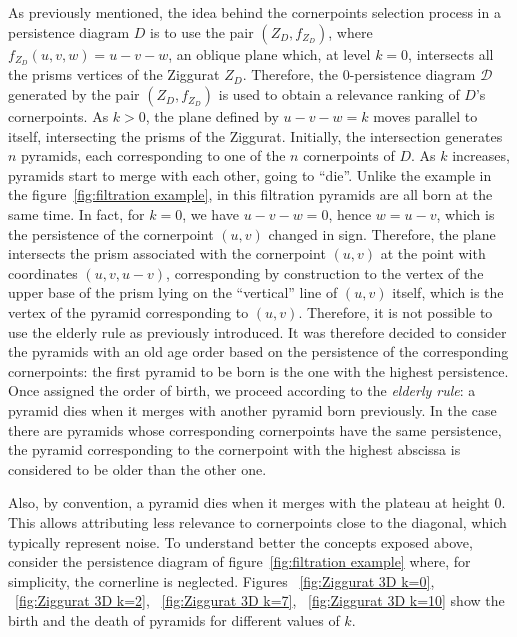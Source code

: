 \documentclass[english, LaM, oneside, noexaminfo]{sapthesis}
\begin{document}
As previously mentioned, the idea behind the cornerpoints selection process in a persistence diagram $D$ is to use the pair $(Z_ {D}, f_ {Z_D})$, where $f_{Z_D}(u, v, w) = u - v - w$, an oblique plane which, at level $k = 0$, intersects all the prisms vertices of the Ziggurat $Z_D$. Therefore, the $0$-persistence diagram $\mathcal{D}$ generated by the pair $(Z_D, f_{Z_D})$ is used to obtain a relevance ranking of $D$'s cornerpoints. As $k>0$, the plane defined by $u-v-w = k$ moves parallel to itself, intersecting the prisms of the Ziggurat. Initially, the intersection generates $n$ pyramids, each corresponding to one of the $n$ cornerpoints of $D$. As $k$ increases, pyramids start to merge with each other, going to ``die''. Unlike the example in the figure~\ref{fig:filtration example}, in this filtration pyramids are all born at the same time. In fact, for $k = 0$, we have $u - v - w = 0$, hence $w = u - v$, which is the persistence of the cornerpoint $(u, v)$ changed in sign. Therefore, the plane intersects the prism associated with the cornerpoint $(u, v)$ at the point with coordinates $(u, v, u-v)$, corresponding by construction to the vertex of the upper base of the prism lying on the ``vertical'' line of $(u, v)$ itself, which is the vertex of the pyramid corresponding to $(u, v)$. Therefore, it is not possible to use the elderly rule as previously introduced. It was therefore decided to consider the pyramids with an old age order based on the persistence of the corresponding cornerpoints: the first pyramid to be born is the one with the highest persistence. Once assigned the order of birth, we proceed according to the \textit{elderly rule}: a pyramid dies when it merges with another pyramid born previously. In the case there are pyramids whose corresponding cornerpoints have the same persistence, the pyramid corresponding to the cornerpoint with the highest abscissa is considered to be older than the other one.

\noindent Also, by convention, a pyramid dies when it merges with
the plateau at height $0$. This allows attributing less relevance to cornerpoints close to the diagonal, which typically represent noise. To understand better the concepts exposed above, consider the persistence diagram of figure~\ref{fig:filtration example} where, for simplicity, the cornerline is neglected. Figures ~\ref{fig:Ziggurat 3D k=0}, ~\ref{fig:Ziggurat 3D k=2}, ~\ref{fig:Ziggurat 3D k=7}, ~\ref{fig:Ziggurat 3D k=10} show the birth and the death of pyramids for different values of $k$.
\end{document}
